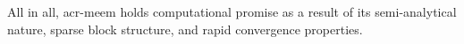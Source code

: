 \documentclass[lineno]{JFM-FLM_Au}
\begin{document}
All in all, \gls{acr-meem} holds computational promise as a result of its semi-analytical nature, sparse block structure, and rapid convergence properties.
%
%
%
%
%
%
%
%
%
%
%
%
%
%
%
\end{document}
